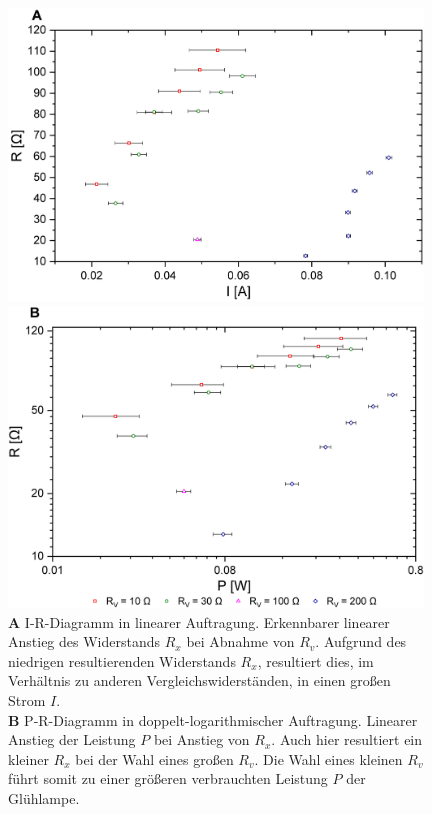 \documentclass[a4paper,usenatbib]{aspdoc}
\begin{document}
            \begin{figure}
                \centering
                
                \includegraphics[width=110mm]{graphs/bulbir_res1.png}
                
                \hspace{.15cm}
                \includegraphics[width=110mm]{graphs/bulbpr_res1.png}
                
                \caption{
                    \textbf{A} I-R-Diagramm in linearer Auftragung. Erkennbarer linearer Anstieg des Widerstands $R_x$ bei Abnahme von $R_v$. Aufgrund des niedrigen resultierenden Widerstands $R_x$, resultiert dies, im Verhältnis zu anderen Vergleichswiderständen, in einen großen Strom $I$. \\
                    \textbf{B} P-R-Diagramm in doppelt-logarithmischer Auftragung. Linearer Anstieg der Leistung $P$ bei Anstieg von $R_x$. Auch hier resultiert ein kleiner $R_x$ bei der Wahl eines großen $R_v$. Die Wahl eines kleinen $R_v$ führt somit zu einer größeren verbrauchten Leistung $P$ der Glühlampe. 
                    }
                \label{fig:bulb}
            \end{figure}
            
\end{document}
